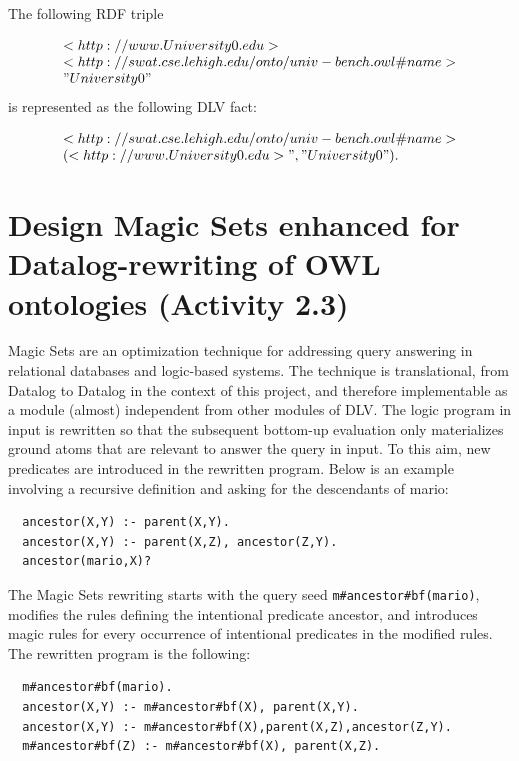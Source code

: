 \documentclass[oneside]{book}
\begin{document}
The following RDF triple

\[
\begin{array}{l}
<http://www.University0.edu> \\
<http://swat.cse.lehigh.edu/onto/univ-bench.owl\#name> \\
"University0"
\end{array}
\]
is represented as the following DLV fact:

\[
\begin{array}{l}
<http://swat.cse.lehigh.edu/onto/univ-bench.owl\#name>\\
(<http://www.University0.edu>", "University0").
\end{array}
\]






\section{Design Magic Sets enhanced for Datalog-rewriting of OWL ontologies (Activity 2.3)}
Magic Sets are an optimization technique for addressing query answering in relational databases and logic-based systems. The technique is translational, from Datalog to Datalog in the context of this project, and therefore implementable as a module (almost) independent from other modules of DLV. The logic program in input is rewritten so that the subsequent bottom-up evaluation only materializes ground atoms that are relevant to answer the query in input. To this aim, new predicates are introduced in the rewritten program. Below is an example involving a recursive definition and asking for the descendants of mario:
\begin{verbatim}
  ancestor(X,Y) :- parent(X,Y).
  ancestor(X,Y) :- parent(X,Z), ancestor(Z,Y).
  ancestor(mario,X)?
\end{verbatim}

The Magic Sets rewriting starts with the query seed {\tt m\#ancestor\#bf(mario)}, modifies the rules defining the intentional predicate ancestor, and introduces magic rules for every occurrence of intentional predicates in the modified rules. The rewritten program is the following:
\begin{verbatim}
  m#ancestor#bf(mario).
  ancestor(X,Y) :- m#ancestor#bf(X), parent(X,Y).
  ancestor(X,Y) :- m#ancestor#bf(X),parent(X,Z),ancestor(Z,Y).
  m#ancestor#bf(Z) :- m#ancestor#bf(X), parent(X,Z).
\end{verbatim}
\end{document}
